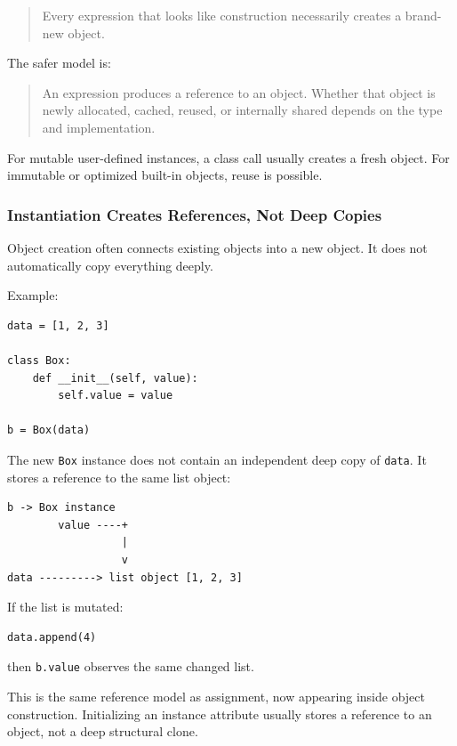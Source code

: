 \begin{quote}
Every expression that looks like construction necessarily creates a brand-new object.
\end{quote}

The safer model is:

\begin{quote}
An expression produces a reference to an object. Whether that object is newly allocated, cached, reused, or internally shared depends on the type and implementation.
\end{quote}

For mutable user-defined instances, a class call usually creates a fresh object. For immutable or optimized built-in objects, reuse is possible.

\subsubsection*{Instantiation Creates References, Not Deep Copies}

Object creation often connects existing objects into a new object. It does not automatically copy everything deeply.

Example:

\begin{verbatim}
data = [1, 2, 3]

class Box:
    def __init__(self, value):
        self.value = value

b = Box(data)
\end{verbatim}

The new \texttt{Box} instance does not contain an independent deep copy of \texttt{data}. It stores a reference to the same list object:

\begin{verbatim}
b -> Box instance
        value ----+
                  |
                  v
data ---------> list object [1, 2, 3]
\end{verbatim}

If the list is mutated:

\begin{verbatim}
data.append(4)
\end{verbatim}

then \texttt{b.value} observes the same changed list.

This is the same reference model as assignment, now appearing inside object construction. Initializing an instance attribute usually stores a reference to an object, not a deep structural clone.

